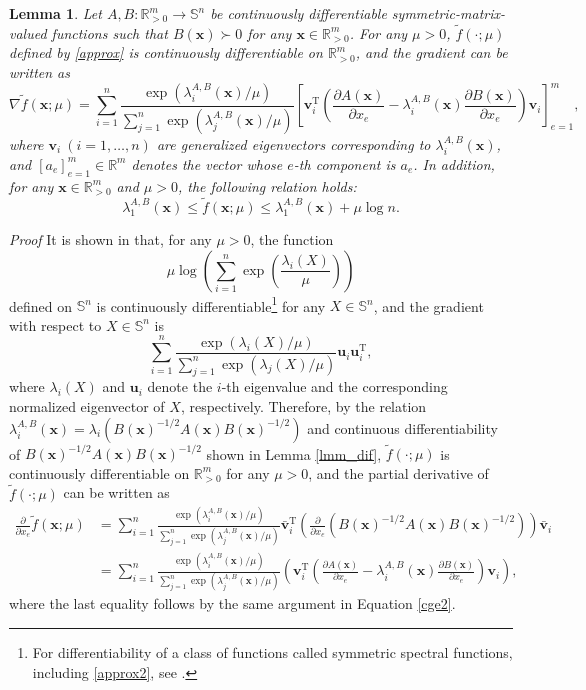\documentclass[sn-mathphys,Numbered]{sn-jnl}%
\theoremstyle{thmstyleone}%
\theoremstyle{thmstyletwo}%
\theoremstyle{thmstylethree}%
\newtheorem{lemma}[theorem]{Lemma}
\newcommand{\e}[1]{\begin{equation}#1\end{equation}}
\newcommand{\prn}[1]{\left(#1\right)}
\newcommand{\ang}[1]{\left\langle#1\right\rangle}
\def\rm{\mathbb{R}^m}
\def\tp{\mathrm{T}}
\def\lamx{\lambda^{A,B}_1(\boldsymbol{x})}
\def\lamxi{\lambda^{A,B}_i(\boldsymbol{x})}
\def\lamxj{\lambda^{A,B}_j(\boldsymbol{x})}
\begin{document}
\begin{lemma}
Let $A,B:\mathbb{R}^m_{>0}\to\mathbb{S}^n$ be continuously differentiable symmetric-matrix-valued functions such that $B(\bm{x})\succ 0$ for any $\bm{x}\in\mathbb{R}^m_{>0}$. For any $\mu>0$, $\tilde{f}(\cdot;\mu)$ defined by \eqref{approx} is continuously differentiable on $\mathbb{R}^m_{>0}$, and the gradient can be written as 
\e{
\nabla\tilde{f}(\bm{x};\mu)= \sum_{i=1}^n \frac{\exp(\lamxi/\mu)}{\sum_{j=1}^n \exp(\lambda^{A,B}_{j}(\bm{x})/\mu)}\left[\bm{v}_i^\tp \left(\frac{\partial A(\bm{x})}{\partial x_e}-\lamxi \frac{\partial B(\bm{x})}{\partial x_e}\right)\bm{v}_i\right]_{e=1}^m,
\label{grad}
}
where $\bm{v}_i\ (i=1,\ldots,n)$ are generalized eigenvectors corresponding to $\lamxi$, and $[a_e]_{e=1}^m\in\rm$ denotes the vector whose $e$-th component is $a_e$. In addition, for any $\bm{x}\in\mathbb{R}^m_{>0}$ and $\mu>0$, the following relation holds:
\e{
\lamx\le\tilde{f}(\bm{x};\mu)\le\lamx+\mu\log n.
\label{error}
}
\label{l_grad}
\end{lemma}
{\it Proof }
It is shown in \cite{nesterov07} that, for any $\mu>0$, the function
\e{
\mu\log\left(\sum_{i=1}^n \exp{\left(\frac{\lambda_i(X)}{\mu}\right)}\right)
\label{approx2}
}
defined on $\mathbb{S}^n$ is continuously differentiable\footnote{For differentiability of a class of functions called symmetric spectral functions, including \eqref{approx2}, see \cite{beck17,chen04,lewis01}.} for any $X\in\mathbb{S}^n$, and the gradient with respect to $X\in\mathbb{S}^n$ is 
\e{
\sum_{i=1}^n\frac{\exp(\lambda_i(X)/\mu)}{\sum_{j=1}^n \exp(\lambda_j(X)/\mu)}\bm{u}_i\bm{u}_i^\tp,
}
where $\lambda_i(X)$ and $\bm{u}_i$ denote the $i$-th eigenvalue and the corresponding normalized eigenvector of $X$, respectively. Therefore, by the relation $\lamxi =\lambda_i(B(\bm{x})^{-1/2}A(\bm{x})B(\bm{x})^{-1/2})$ and continuous differentiability of $B(\bm{x})^{-1/2}A(\bm{x})B(\bm{x})^{-1/2}$ shown in Lemma \ref{lmm_dif}, $\tilde{f}(\cdot;\mu)$ is continuously differentiable on $\mathbb{R}_{>0}^m$ for any $\mu>0$, and the partial derivative of $\tilde{f}(\cdot;\mu)$ can be written as 
\begin{align}
\frac{\partial}{\partial x_e}\tilde{f}(\bm{x};\mu)
& = \sum_{i=1}^n\frac{\exp(\lamxi/\mu)}{\sum_{j=1}^n \exp(\lamxj/\mu)}\bar{\bm{v}}_i^\tp\left(\frac{\partial}{\partial x_e}\prn{B(\bm{x})^{-1/2}A(\bm{x})B(\bm{x})^{-1/2}}\right)\bar{\bm{v}}_i\\
& = \sum_{i=1}^n\frac{\exp(\lamxi/\mu)}{\sum_{j=1}^n \exp(\lamxj/\mu)}\prn{\bm{v}_i^\tp\left(\frac{\partial A(\bm{x})}{\partial x_e}-\lamxi \frac{\partial B(\bm{x})}{\partial x_e}\right)\bm{v}_i},
\end{align}
where the last equality follows by the same argument in Equation \eqref{cge2}.
\end{document}
